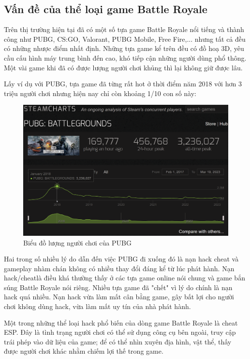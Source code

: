 \documentclass[12pt,a4paper]{article}
\begin{document}
  \subsection{Vấn đề của thể loại game Battle Royale}
  Trên thị trường hiện tại đã có một số tựa game Battle Royale nổi tiếng và thành công như PUBG, CS:GO, Valorant, PUBG Mobile, Free Fire,... nhưng tất cả đều có những nhược điểm nhất định. Những tựa game kể trên đều có đồ hoạ 3D, yêu cầu cấu hình máy trung bình đến cao, khó tiếp cận những người dùng phổ thông. Một vài game khi đã có được lượng người chơi khủng thì lại không giữ được lâu.
  
  Lấy ví dụ với PUBG, tựa game đã từng rất hot ở thời điểm năm 2018 với hơn 3 triệu người chơi nhưng hiện nay chỉ còn khoảng 1/10 con số này:
  \begin{figure}[H]
      \centering
      \includegraphics[width=\textwidth]{Img/intro/PUBG.png}
      \caption[Biểu đồ PUBG]{Biểu đồ lượng người chơi của PUBG{\protect\footnotemark}}
  \end{figure}
  
  Hai trong số nhiều lý do dẫn đến việc PUBG đi xuống đó là nạn hack cheat và gameplay nhàm chán không có nhiều thay đổi đáng kể từ lúc phát hành.\footnotemark
  Nạn hack/cheat\footnotemark là điều khá thường thấy ở các tựa game online nói chung và game bắn súng Battle Royale nói riêng. Nhiều tựa game đã "chết" vì lý do chính là nạn hack quá nhiều. Nạn hack vừa làm mất cân bằng game, gây bất lợi cho người chơi không dùng hack, vừa làm mất uy tín của nhà phát hành.
  
  Một trong những thể loại hack phổ biến của dòng game Battle Royale là cheat ESP. Đây là tình trạng người chơi có thể sử dụng công cụ bên ngoài, truy cập trái phép vào dữ liệu của game; để có thể nhìn xuyên địa hình, vật thể, thấy được người chơi khác nhằm chiếm lợi thế trong game.
  
\end{document}
